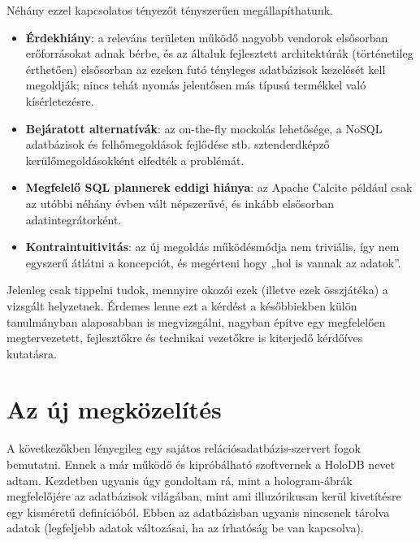 \documentclass[
    parspace,
    noindent,
    nohyp,
]{elteiktdk}[2023/04/10]
\newcommand{\todoref}[1]{\todo[inline, noinlinepar, color=red, textcolor=white, inlinewidth=0.6cm, caption={#1}]{\large \textbf{×}}}
\begin{document}
Néhány ezzel kapcsolatos tényezőt tényszerűen megállapíthatunk.

\begin{itemize}
    \item \textbf{Érdekhiány}: a releváns területen működő nagyobb vendorok elsősorban
          erőforrásokat adnak bérbe, és az általuk fejlesztett architektúrák (történetileg érthetően)
          elsősorban az ezeken futó tényleges adatbázisok kezelését kell megoldják;
          nincs tehát nyomás jelentősen más típusú termékkel való kísérletezésre.
          \todoref{+CITE: (miért nincs?) erőforrásokat adnak bérbe}
    \item \textbf{Bejáratott alternatívák}: az on-the-fly mockolás lehetősége,
          a NoSQL adatbázisok és felhőmegoldások fejlődése stb.
          sztenderdképző kerülőmegoldásokként elfedték a problémát.
          \todoref{+CITE: (miért nincs?) kerülőmegoldások}
    \item \textbf{Megfelelő SQL plannerek eddigi hiánya}: az Apache Calcite például
          csak az utóbbi néhány évben vált népszerűvé, és inkább elsősorban adatintegrátorként.
          \todoref{+CITE: (miért nincs?) SQL-plannerek csak utóbb}
    \item \textbf{Kontraintuitivitás}: az új megoldás működésmódja nem triviális,
          így nem egyszerű átlátni a koncepciót, és megérteni hogy „hol is vannak az adatok”.
          \todoref{+CITE: (miért nincs?) hol is vannak az adatok}
\end{itemize}

Jelenleg csak tippelni tudok, mennyire okozói ezek (illetve ezek összjátéka) a vizsgált helyzetnek.
Érdemes lenne ezt a kérdést a későbbiekben külön tanulmányban alaposabban is megvizsgálni,
nagyban építve egy megfelelően megtervezetett, fejlesztőkre és technikai vezetőkre is kiterjedő kérdőíves kutatásra.

\section{Az új megközelítés}

A következőkben lényegileg egy sajátos relációsadatbázis-szervert fogok bemutatni.
Ennek a már működő és kipróbálható szoftvernek a HoloDB nevet adtam.
Kezdetben ugyanis úgy gondoltam rá,
mint a hologram-ábrák megfelelőjére az adatbázisok világában,
mint ami illuzórikusan kerül kivetítésre egy kisméretű definícióból.
Ebben az adatbázisban ugyanis nincsenek tárolva adatok
(legfeljebb adatok változásai, ha az írhatóság be van kapcsolva).
\end{document}
